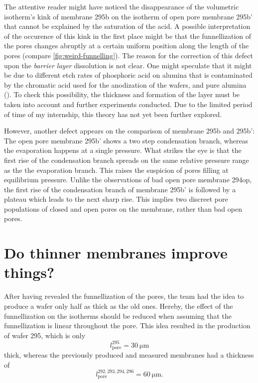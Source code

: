 \documentclass[../thesis.tex]{subfiles}
\begin{document}
          The attentive reader might have noticed the disappearance of the volumetric isotherm's kink of membrane 295b on the isotherm of open pore membrane 295b' that cannot be explained by the saturation of the acid. A possible interpretation of the occurence of this kink in the first place might be that the funnellization of the pores changes abruptly at a certain uniform position along the length of the pores (compare \cref{fig:weird-funnelling}). The reason for the correction of this defect upon the \textit{barrier layer} dissolution is not clear. One might speculate that it might be due to different etch rates of phosphoric acid on alumina that is contaminated by the chromatic acid used for the anodization of the wafers, and pure alumina (\cite{Rufolf-aam}). To check this possibility, the thickness and formation of the layer must be taken into account and further experiments conducted. Due to the limited period of time of my internship, this theory has not yet been further explored.
          \medskip

          However, another defect appears on the comparison of membrane 295b and 295b': The open pore membrane 295b' shows a two step condensation branch, whereas the evaporation happens at a single pressure. What strikes the eye is that the first rise of the condensation branch spreads on the same relative pressure range as the the evaporation branch. This raises the suspicion of pores filling at equilibrium pressure. Unlike the observations of bad open pore membrane 294op, the first rise of the condensation branch of membrane 295b' is followed by a plateau which leads to the next sharp rise. This implies two discreet pore populations of closed and open pores on the membrane, rather than bad open pores.

          


  \section{Do thinner membranes improve things?}
  \label{sec:thinner-membranes}

    After having revealed the funnellization of the pores, the team had the idea to produce a wafer only half as thick as the old ones. Hereby, the effect of the funnellization on the isotherms should be reduced when assuming that the funnellization is linear throughout the pore. This idea resulted in the production of wafer 295, which is only
    \begin{equation}
        l^{295}_\mathrm{pore}=\SI{30}{\micro\meter}
    \end{equation}
    thick, whereas the previously produced and measured membranes had a thickness of
    \begin{equation}
        l^{292,293,294,296}_\mathrm{pore}=\SI{60}{\micro\meter}.
    \end{equation}
\end{document}
